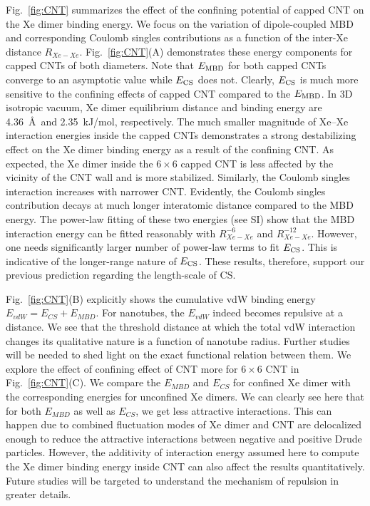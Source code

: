 \documentclass[aps,prl,groupaddress, twocolumn]{revtex4-1}  %
\begin{document}
Fig.~\ref{fig:CNT} summarizes the effect of the confining potential of capped CNT on the Xe dimer binding energy. We focus on the variation of dipole-coupled MBD and corresponding Coulomb singles contributions as a function of the inter-Xe distance $R_{Xe-Xe}$. Fig.~\ref{fig:CNT}(A) demonstrates these energy components for capped CNTs of both diameters. Note that $E_{\rm MBD}$ for both capped CNTs converge to an asymptotic value while $E_{\rm CS}$ does not. Clearly, $E_{\rm CS}$ is much more sensitive to the confining effects of capped CNT compared to the $E_{\rm MBD}$. In 3D isotropic vacuum, Xe dimer equilibrium distance and binding energy are 4.36~\AA\ and 2.35~kJ/mol, respectively\cite{Jerabek_2017}. The much smaller magnitude of Xe--Xe interaction energies inside the capped CNTs demonstrates a strong destabilizing effect on the Xe dimer binding energy as a result of the confining CNT\@. As expected, the Xe dimer inside the $6\times6$ capped CNT is less affected by the vicinity of the CNT wall and is more stabilized. Similarly, the Coulomb singles interaction increases with narrower CNT\@. Evidently, the Coulomb singles contribution decays at much longer interatomic distance compared to the MBD energy. The power-law fitting of these two energies (see SI) show that the MBD interaction energy can be fitted reasonably with $R_{Xe-Xe}^{-6}$ and $R_{Xe-Xe}^{-12}$. However, one needs significantly larger number of power-law terms to fit $E_{\rm CS}$. This is indicative of the longer-range nature of $E_{\rm CS}$. These results, therefore, support our previous prediction regarding the length-scale of CS\cite{sadhukhan_prl_2017, sadhukhan_prl_reply2018}.

Fig.~\ref{fig:CNT}(B) explicitly shows the cumulative vdW binding energy $E_{vdW} = E_{CS} + E_{MBD}$. For nanotubes, the $E_{vdW}$ indeed becomes repulsive at a distance. We see that the threshold distance at which the total vdW interaction changes its qualitative nature is a function of nanotube radius. Further studies will be needed to shed light on the exact functional relation between them.
We explore the effect of confining effect of CNT more for $6\times 6$ CNT in Fig.~\ref{fig:CNT}(C). We compare the $E_{MBD}$ and $E_{CS}$ for confined Xe dimer with the corresponding energies for unconfined Xe dimers. We can clearly see here that for both $E_{MBD}$ as well as $E_{CS}$, we get less attractive interactions. This can happen due to combined fluctuation modes of Xe dimer and CNT are delocalized enough to reduce the attractive interactions between negative and positive Drude particles. However, the additivity of interaction energy assumed here to compute the Xe dimer binding energy inside CNT can also affect the results quantitatively. Future studies will be targeted to understand the mechanism of repulsion in greater details.    
\end{document}
